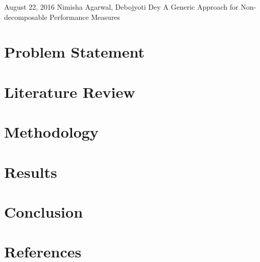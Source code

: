 \documentclass[a4paper,11pt,reqno]{article}
\begin{document}
	{August 22, 2016}      			              %
	{Nimisha Agarwal, Debojyoti Dey}                     	          %
	{A Generic Approach for Non-decomposable Performance Measures}  						%
\section{Problem Statement}
\section{Literature Review}	
\section{Methodology}
\section{Results}
\section{Conclusion}
\section{References}
	
\end{document}
